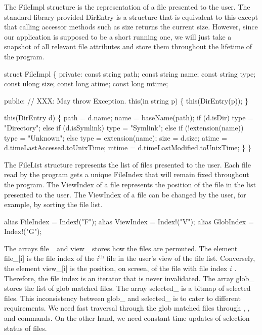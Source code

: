 \newpage

The {\Tt{}FileImpl\nwendquote} structure is the representation of a file presented
to the user. The standard library provided {\Tt{}DirEntry\nwendquote} is a structure
that is equivalent to this except that calling accessor methods such
as {\Tt{}size\nwendquote} returns the current size. However, since our application
is supposed to be a short running one, we will just take a snapshot of
all relevant file attributes and store them throughout the lifetime of
the program.

\nwenddocs{}\endmoddef\nwstartdeflinemarkup\nwenddeflinemarkup
struct FileImpl
\{
  private:
  const string path;
  const string name;
  const string type;
  const ulong  size;
  const long   atime;
  const long   mtime;

  public:
  // XXX: May throw Exception.
  this(in string p)
  \{
    this(DirEntry(p));
  \}

  this(DirEntry d)
  \{
    path = d.name;
    name = baseName(path);
    if (d.isDir)
      type = "Directory";
    else if (d.isSymlink)
      type = "Symlink";
    else if (!extension(name))
      type = "Unknown";
    else
      type = extension(name);
    size = d.size;
    atime = d.timeLastAccessed.toUnixTime;
    mtime = d.timeLastModified.toUnixTime;
  \}
\}

\nwendcode{}The {\Tt{}FileList\nwendquote} structure represents the list of files presented to
the user. Each file read by the program gets a unique {\Tt{}FileIndex\nwendquote}
that will remain fixed throughout the program. The {\Tt{}ViewIndex\nwendquote} of a
file represents the position of the file in the list presented to the
user. The {\Tt{}ViewIndex\nwendquote} of a file can be changed by the user, for
example, by sorting the file list.

\nwenddocs{}\endmoddef\nwstartdeflinemarkup\nwenddeflinemarkup
alias FileIndex = Index!("F");
alias ViewIndex = Index!("V");
alias GlobIndex = Index!("G");

\nwendcode{}The arrays {\Tt{}file{\_}\nwendquote} and {\Tt{}view{\_}\nwendquote} stores how the files are
permuted. The element {\Tt{}file{\_}[i]\nwendquote} is the file index of the
$i^\text{th}$ file in the user's view of the file list. Conversely,
the element {\Tt{}view{\_}[i]\nwendquote} is the position, on screen, of the file with
file index $i$ . Therefore, the file index is an iterator that is
never invalidated. The array {\Tt{}glob{\_}\nwendquote} stores the list of glob matched
files. The array {\Tt{}selected{\_}\nwendquote} is a bitmap of selected files. This
inconsistency between {\Tt{}glob{\_}\nwendquote} and {\Tt{}selected{\_}\nwendquote} is to cater to
different requirements. We need fast traversal through the glob
matched files through , , and  commands. On
the other hand, we need constant time updates of selection status of
files.

